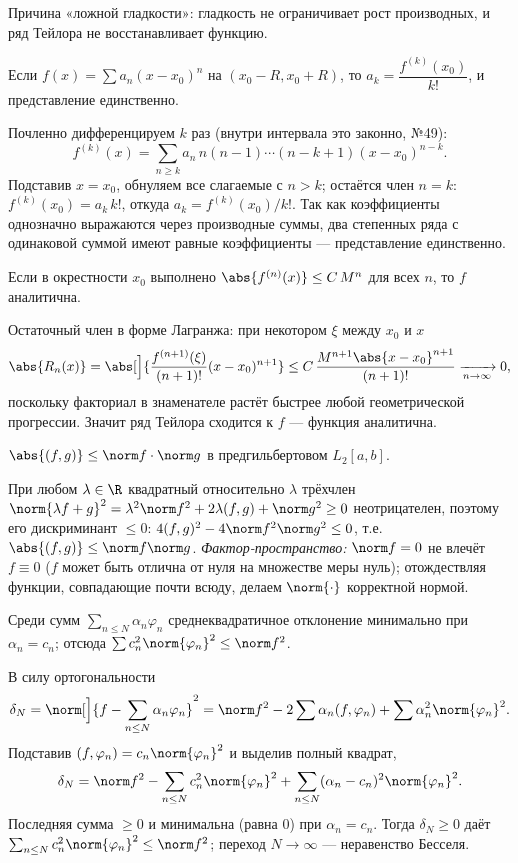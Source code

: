 Причина «ложной гладкости»: гладкость не ограничивает рост производных, и ряд Тейлора не
восстанавливает функцию.

\stmt Если $f(x)=\sum a_n(x-x_0)^n$ на $(x_0-R,x_0+R)$, то $a_k=\dfrac{f^{(k)}(x_0)}{k!}$, и
представление единственно.

\dok Почленно дифференцируем $k$ раз (внутри интервала это законно, №49):
\[
  f^{(k)}(x)=\sum_{n\ge k}a_n\,n(n-1)\cdots(n-k+1)(x-x_0)^{n-k}.
\]
Подставив $x=x_0$, обнуляем все слагаемые с $n>k$; остаётся член $n=k$: $f^{(k)}(x_0)=a_k\,k!$,
откуда $a_k=f^{(k)}(x_0)/k!$. Так как коэффициенты однозначно выражаются через производные суммы,
два степенных ряда с одинаковой суммой имеют равные коэффициенты — представление единственно.

\stmt Если в окрестности $x_0$ выполнено $\abs{f^{(n)}(x)}\le C\,M^n$ для всех $n$, то $f$
аналитична.

\dok Остаточный член в форме Лагранжа: при некотором $\xi$ между $x_0$ и $x$
\[
  \abs{R_n(x)}=\abs[\Big]{\frac{f^{(n+1)}(\xi)}{(n+1)!}(x-x_0)^{n+1}}
  \le C\,\frac{M^{n+1}\abs{x-x_0}^{n+1}}{(n+1)!}\xrightarrow[n\to\infty]{}0,
\]
поскольку факториал в знаменателе растёт быстрее любой геометрической прогрессии. Значит ряд Тейлора
сходится к $f$ — функция аналитична.

\stmt $\abs{(f,g)}\le\norm f\cdot\norm g$ в предгильбертовом $L_2[a,b]$.

\dok При любом $\lambda\in\R$ квадратный относительно $\lambda$ трёхчлен
$\norm{\lambda f+g}^2=\lambda^2\norm f^2+2\lambda(f,g)+\norm g^2\ge0$ неотрицателен, поэтому его
дискриминант $\le0$: $4(f,g)^2-4\norm f^2\norm g^2\le0$, т.е. $\abs{(f,g)}\le\norm f\norm g$.
\emph{Фактор-пространство:} $\norm f=0$ не влечёт $f\equiv0$ ($f$ может быть отлична от нуля на
множестве меры нуль); отождествляя функции, совпадающие почти всюду, делаем $\norm{\cdot}$
корректной нормой.

\stmt Среди сумм $\sum_{n\le N}\alpha_n\varphi_n$ среднеквадратичное отклонение минимально при
$\alpha_n=c_n$; отсюда $\sum c_n^2\norm{\varphi_n}^2\le\norm f^2$.

\dok В силу ортогональности
\[
  \delta_N=\norm[\Big]{f-\sum_{n\le N}\alpha_n\varphi_n}^2
  =\norm f^2-2\sum\alpha_n(f,\varphi_n)+\sum\alpha_n^2\norm{\varphi_n}^2 .
\]
Подставив $(f,\varphi_n)=c_n\norm{\varphi_n}^2$ и выделив полный квадрат,
\[
  \delta_N=\norm f^2-\sum_{n\le N}c_n^2\norm{\varphi_n}^2+\sum_{n\le N}(\alpha_n-c_n)^2\norm{\varphi_n}^2 .
\]
Последняя сумма $\ge0$ и минимальна (равна $0$) при $\alpha_n=c_n$. Тогда $\delta_N\ge0$ даёт
$\sum_{n\le N}c_n^2\norm{\varphi_n}^2\le\norm f^2$; переход $N\to\infty$ — неравенство Бесселя.


